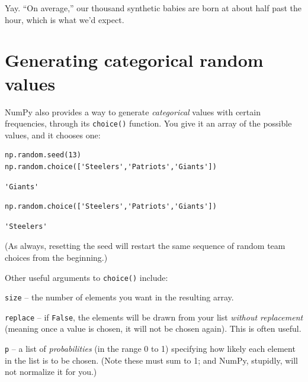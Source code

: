 \medskip
Yay. ``On average,'' our thousand synthetic babies are born at about half past
the hour, which is what we'd expect.


\section{Generating categorical random values}


NumPy also provides a way to generate \textit{categorical} values with certain
frequencies, through its \texttt{choice()} function. You give it an array of
the possible values, and it chooses one:

\begin{Verbatim}[fontsize=\small,samepage=true,frame=single,framesep=3mm]
np.random.seed(13)
np.random.choice(['Steelers','Patriots','Giants'])
\end{Verbatim}
\vspace{-.2in}

\begin{Verbatim}[fontsize=\small,samepage=true,frame=leftline,framesep=5mm,framerule=1mm]
'Giants'
\end{Verbatim}

\begin{Verbatim}[fontsize=\small,samepage=true,frame=single,framesep=3mm]
np.random.choice(['Steelers','Patriots','Giants'])
\end{Verbatim}
\vspace{-.2in}

\begin{Verbatim}[fontsize=\small,samepage=true,frame=leftline,framesep=5mm,framerule=1mm]
'Steelers'
\end{Verbatim}

(As always, resetting the seed will restart the same sequence of random team
choices from the beginning.)

\begin{samepage}
Other useful arguments to \texttt{choice()} include:

\begin{compactitem}
\item \texttt{size} -- the number of elements you want in the resulting array.
\item \texttt{replace} -- if \texttt{False}, the elements will be drawn from
your list \textit{without replacement} (meaning once a value is chosen, it
will not be chosen again). This is often useful.
\item \texttt{p} -- a list of \textit{probabilities} (in the range 0 to 1)
specifying how likely each element in the list is to be chosen. (Note these
must sum to 1; and NumPy, stupidly, will not normalize it for you.)
\end{compactitem}
\end{samepage}

